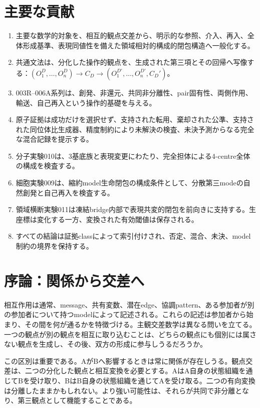 \documentclass[11pt,a4paper]{article}
\begin{document}
\section*{主要な貢献}
{\small
\begin{enumerate}[itemsep=0.1em,topsep=0.25em]
  \item 主要な数学的対象を、相互的観点交差から、明示的な参照、介入、再入、全体形成基準、表現同値性を備えた領域相対的構成的閉包構造へ一般化する。
  \item 共通文法は、分化した操作的観点を、生成された第三項とその回帰へ写像する：$(O_1^D,\ldots,O_n^D)\rightarrow C_D\rightarrow(O_1^{D\prime},\ldots,O_n^{D\prime},C_D')$。
  \item 003R--006A系列は、創発、非還元、共同非分離性、pair固有性、両側作用、輸送、自己再入という操作的基礎を与える。
  \item 原子証拠は成功だけを選択せず、支持された転用、棄却された公準、支持された同位体比生成器、精度制約により未解決の検査、未決予測からなる完全な混合記録を提示する。
  \item 分子実験010は、3基底族と表現変更にわたり、完全担体による4-centre全体の構成を検査する。
  \item 細胞実験009は、縮約model生命閉包の構成条件として、分散第三modeの自然創発と自己再入を検査する。
  \item 領域横断実験011は凍結bridge内部で表現共変的閉包を前向きに支持する。生座標は変化する一方、変換された有効閾値は保存される。
  \item すべての結論は証拠classによって索引付けされ、否定、混合、未決、model制約の境界を保持する。
\end{enumerate}
}

\vspace{1.2em}
{\small
\setlength{\parskip}{0pt}
\tableofcontents
}
\clearpage

\section{序論：関係から交差へ}

相互作用は通常、message、共有変数、潜在edge、協調pattern、ある参加者が別の参加者について持つmodelによって記述される。これらの記述は参加者から始まり、その間を何が通るかを特徴づける。主観交差数学は異なる問いを立てる。一つの観点が別の観点を相互に取り込むことは、どちらの観点にも個別には属さない観点を生成し、その後、双方の形成に参与しうるだろうか。

この区別は重要である。AがBへ影響するときは常に関係が存在しうる。観点交差は、二つの分化した観点と相互変換を必要とする。AはA自身の状態組織を通じてBを受け取り、BはB自身の状態組織を通じてAを受け取る。二つの有向変換は分離したままかもしれない。より強い可能性は、それらが共同で非分離となり、第三観点として機能することである。
\end{document}
